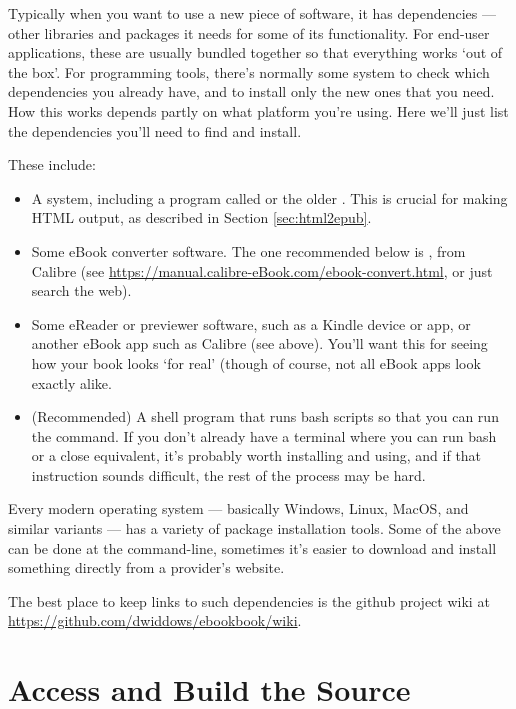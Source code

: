 Typically when you want to use a new piece of software, it has
dependencies --- other libraries and packages it needs for some of its
functionality. For end-user applications, these are usually bundled
together so that everything works `out of the box'. For programming
tools, there's normally some system to check which dependencies you
already have, and to install only the new ones that you need. How this
works depends partly on what platform you're using. Here we'll just list
the dependencies you'll need to find and install.

These include:

\begin{itemize}
\item A \latex system, including a program called  or the older .
  This is crucial for making HTML output, as described in Section
  \ref{sec:html2epub}.
\item Some eBook converter software. The one recommended below is
  , from Calibre (see
  {\small \url{https://manual.calibre-eBook.com/ebook-convert.html}}, or just
  search the web).
\item Some eReader or previewer software, such as a Kindle device or
  app, or another eBook app such as Calibre (see above). You'll want
  this for seeing how your book looks `for real' (though of course,
  not all eBook apps look exactly alike.
\item (Recommended) A shell program that runs bash scripts so that you
  can run the  command. If you don't already have a
  terminal where you can run bash or a close equivalent, it's probably
  worth installing and using, and if that instruction sounds
  difficult, the rest of the process may be hard.
\end{itemize}

Every modern operating system --- basically Windows, Linux, MacOS, and
similar variants --- has a variety of package installation tools.
Some of the above can be done at the command-line, sometimes it's
easier to download and install something directly from a provider's
website.

The best place to keep links to such dependencies is the 
github project wiki at {\small \url{https://github.com/dwiddows/ebookbook/wiki}}.

\section{Access and Build the \latex Source}

